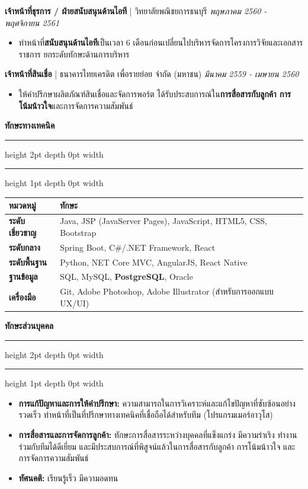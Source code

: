 \documentclass[11pt, a4paper]{article}
\newcommand{\sectiontitle}[1]{
    \vspace{1em}
    {\Large\bfseries\sffamily\color{primaryblue} #1} 
    \vspace{0.3em}
    \hrule height 2pt depth 0pt width \textwidth \color{linecolor}
    \hrule height 1pt depth 0pt width \textwidth
    \vspace{0.7em}
}
\newcommand{\jobentry}[3]{
    \vspace{0.7em} %
    \textbf{\color{black}#1} | #2 \hfill \emph{#3}
}
\begin{document}
\jobentry{เจ้าหน้าที่ธุรการ / ฝ่ายสนับสนุนด้านไอที}{วิทยาลัยพณิชยการธนบุรี}{พฤษภาคม 2560 - พฤศจิกายน 2561}
\begin{itemize}
    \item ทำหน้าที่\textbf{สนับสนุนด้านไอที}เป็นเวลา 6 เดือนก่อนเปลี่ยนไปบริหารจัดการโครงการวิจัยและเอกสารราชการ ยกระดับทักษะด้านการบริหาร
\end{itemize}
\vspace{0.5em}

\jobentry{เจ้าหน้าที่สินเชื่อ}{ธนาคารไทยเครดิต เพื่อรายย่อย จำกัด (มหาชน)}{มีนาคม 2559 - เมษายน 2560}
\begin{itemize}
    \item ให้คำปรึกษาผลิตภัณฑ์สินเชื่อและจัดการพอร์ต ได้รับประสบการณ์ใน\textbf{การสื่อสารกับลูกค้า การโน้มน้าวใจ}และการจัดการความสัมพันธ์
\end{itemize}
\vspace{0.5em}

\sectiontitle{ทักษะทางเทคนิค}
\color{black}

\begin{tabularx}{\textwidth}{@{} l >{\raggedright\arraybackslash}X @{}}
    \toprule %
    \textbf{หมวดหมู่} & \textbf{ทักษะ} \\
    \midrule %
    \textbf{ระดับเชี่ยวชาญ} & Java, JSP (JavaServer Pages), JavaScript, HTML5, CSS, Bootstrap \\[0.3em]
    \textbf{ระดับกลาง} & Spring Boot, C\#/.NET Framework, React \\[0.3em]
    \textbf{ระดับพื้นฐาน} & Python, NET Core MVC, AngularJS, React Native \\[0.3em]
    \textbf{ฐานข้อมูล} & SQL, MySQL, \textbf{PostgreSQL}, Oracle \\[0.3em]
    \textbf{เครื่องมือ} & Git, Adobe Photoshop, Adobe Illustrator (สำหรับการออกแบบ UX/UI) \\
    \bottomrule %
\end{tabularx}


\sectiontitle{ทักษะส่วนบุคคล}
\color{black}
\begin{itemize}
    \item \textbf{การแก้ปัญหาและการให้คำปรึกษา:} ความสามารถในการวิเคราะห์และแก้ไขปัญหาที่ซับซ้อนอย่างรวดเร็ว ทำหน้าที่เป็นที่ปรึกษาทางเทคนิคที่เชื่อถือได้สำหรับทีม (โปรแกรมเมอร์อาวุโส)
    \item \textbf{การสื่อสารและการจัดการลูกค้า:} ทักษะการสื่อสารระหว่างบุคคลที่แข็งแกร่ง มีความร่าเริง ทำงานร่วมกับทีมได้ดีเยี่ยม และมีประสบการณ์ที่พิสูจน์แล้วในการสื่อสารกับลูกค้า การโน้มน้าวใจ และการจัดการความสัมพันธ์
    \item \textbf{ทัศนคติ:} เรียนรู้เร็ว มีความอดทน
\end{itemize}
\end{document}
